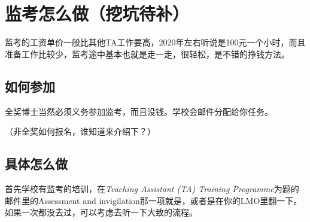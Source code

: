 \section{监考怎么做（挖坑待补）}

监考的工资单价一般比其他TA工作要高，2020年左右听说是100元一个小时，而且准备工作比较少，监考途中基本也就是走一走，很轻松，是不错的挣钱方法。

\subsection{如何参加}
全奖博士当然必须义务参加监考，而且没钱。学校会邮件分配给你任务。

（非全奖如何报名，谁知道来介绍下？）

\subsection{具体怎么做}
首先学校有监考的培训，在\textit{Teaching Assistant (TA) Training Programme}为题的邮件里的Assessment and invigilation那一项就是，或者是在你的LMO里翻一下。如果一次都没去过，可以考虑去听一下大致的流程。

